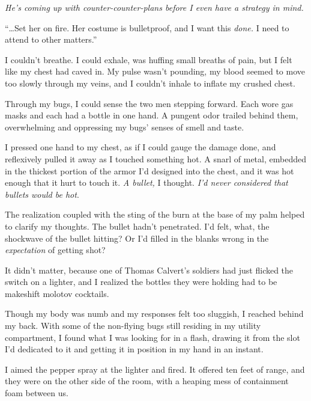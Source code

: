 \emph{He's coming up with counter-counter-plans before I even have a strategy in mind.}



``\ldots{}Set her on fire.  Her costume is bulletproof, and I want this \emph{done.  }I need to attend to other matters.''



I couldn't breathe.  I could exhale, was huffing small breaths of pain, but I felt like my chest had caved in.  My pulse wasn't pounding, my blood seemed to move too slowly through my veins, and I couldn't inhale to inflate my crushed chest.



Through my bugs, I could sense the two men stepping forward.  Each wore gas masks and each had a bottle in one hand.  A pungent odor trailed behind them, overwhelming and oppressing my bugs' senses of smell and taste.



I pressed one hand to my chest, as if I could gauge the damage done, and reflexively pulled it away as I touched something hot.  A snarl of metal, embedded in the thickest portion of the armor I'd designed into the chest, and it was hot enough that it hurt to touch it.  \emph{A bullet,} I thought.  \emph{I'd never considered that bullets would be hot}.



The realization coupled with the sting of the burn at the base of my palm helped to clarify my thoughts.  The bullet hadn't penetrated.  I'd felt, what, the shockwave of the bullet hitting?  Or I'd filled in the blanks wrong in the \emph{expectation} of getting shot?



It didn't matter, because one of Thomas Calvert's soldiers had just flicked the switch on a lighter, and I realized the bottles they were holding had to be makeshift molotov cocktails.



Though my body was numb and my responses felt too sluggish, I reached behind my back.  With some of the non-flying bugs still residing in my utility compartment, I found what I was looking for in a flash, drawing it from the slot I'd dedicated to it and getting it in position in my hand in an instant.



I aimed the pepper spray at the lighter and fired.  It offered ten feet of range, and they were on the other side of the room, with a heaping mess of containment foam between us.



